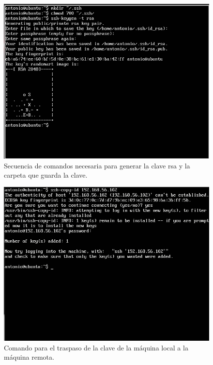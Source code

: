 \begin{figure}[H]
    \begin{center}
        \includegraphics[scale=0.45]{imagenes/img2}
        \caption{Secuencia de comandos necesaria para generar la clave rsa y la carpeta que guarda la clave.}
        \label{fig2}
    \end{center}
\end{figure}

\begin{figure}[H]
    \begin{center}
        \includegraphics[scale=0.45]{imagenes/img3}
        \caption{Comando para el traspaso de la clave de la máquina local a la máquina remota.}
        \label{fig3}
    \end{center}
\end{figure}

